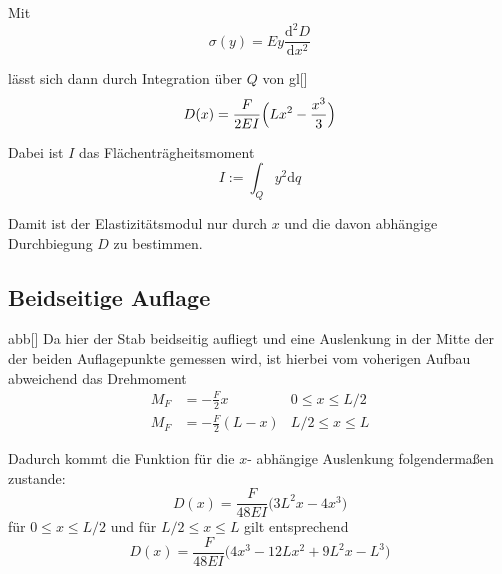 Mit \begin{equation}
    \sigma (y) = E y \frac{\text{d}^2 D}{\text{d} x^2}
\end{equation}

lässt sich dann durch Integration über $Q$ von gl[] \begin{equation}
    D(x) = \frac{F}{2EI} \Bigl( L x^2 - \frac{x^3}3 \Bigr)
\end{equation}

Dabei ist $I$ das Flächenträgheitsmoment \begin{equation}
    I := \int_Q y^2 \text{d}q
\end{equation}

Damit ist der Elastizitätsmodul nur durch $x$ und die davon abhängige Durchbiegung $D$ zu bestimmen.

\subsection{Beidseitige Auflage}
abb[]
Da hier der Stab beidseitig aufliegt und eine Auslenkung in der Mitte der der beiden Auflagepunkte gemessen wird, ist hierbei
vom voherigen Aufbau abweichend das Drehmoment \begin{align}
M_F &= - \frac{F}2 x       &   0 \leq x \leq L/2 \\
M_F &= - \frac{F}2 (L - x) & L/2 \leq x \leq L
\end{align}

Dadurch kommt die Funktion für die $x$- abhängige Auslenkung folgendermaßen zustande: \begin{equation}
   D(x) = \frac{F}{48EI} \bigl( 3L^2 x -4x^3 \bigr)
\end{equation} für $0 \leq x \leq L/2$
und für $L/2 \leq x \leq L$ gilt entsprechend \begin{equation}
    D(x) = \frac{F}{48EI} \bigl( 4x^3 - 12Lx^2 + 9L^2 x - L^3 \bigr)
\end{equation}

